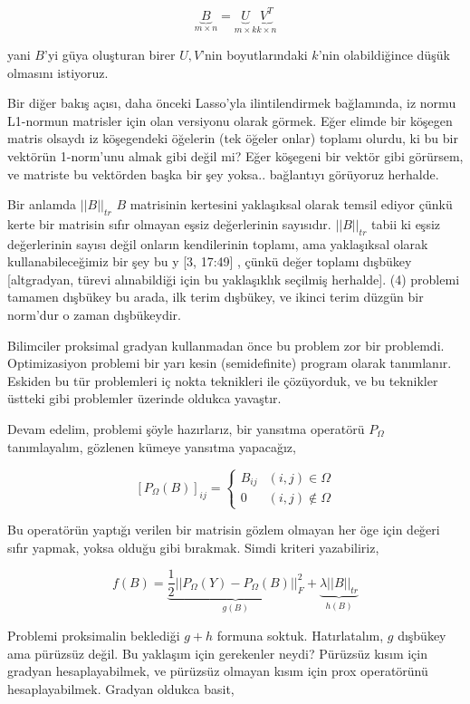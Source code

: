 \documentclass[12pt,fleqn]{article}\usepackage{../../common}
\begin{document}
$$
\underbrace{B}_{m \times n} = 
\underbrace{U}_{m \times k}
\underbrace{V^T}_{k \times n}
$$

yani $B$'yi güya oluşturan birer $U,V$'nin boyutlarındaki $k$'nin
olabildiğince düşük olmasını istiyoruz. 

Bir diğer bakış açısı, daha önceki Lasso'yla ilintilendirmek bağlamında, iz
normu L1-normun matrisler için olan versiyonu olarak görmek. Eğer elimde
bir köşegen matris olsaydı iz köşegendeki öğelerin (tek öğeler onlar)
toplamı olurdu, ki bu bir vektörün 1-norm'unu almak gibi değil mi? Eğer
köşegeni bir vektör gibi görürsem, ve matriste bu vektörden başka bir şey
yoksa.. bağlantıyı görüyoruz herhalde. 

Bir anlamda $||B||_{tr}$ $B$ matrisinin kertesini yaklaşıksal olarak temsil
ediyor çünkü kerte bir matrisin sıfır olmayan eşsiz değerlerinin
sayısıdır. $||B||_{tr}$ tabii ki eşsiz değerlerinin sayısı değil onların
kendilerinin toplamı, ama yaklaşıksal olarak kullanabileceğimiz bir şey bu
y [3, 17:49] , çünkü değer toplamı dışbükey [altgradyan, türevi
alınabildiği için bu yaklaşıklık seçilmiş herhalde].  (4) problemi tamamen
dışbükey bu arada, ilk terim dışbükey, ve ikinci terim düzgün bir norm'dur
o zaman dışbükeydir.

Bilimciler proksimal gradyan kullanmadan önce bu problem zor bir
problemdi. Optimizasiyon problemi bir yarı kesin (semidefinite) program
olarak tanımlanır. Eskiden bu tür problemleri iç nokta teknikleri ile
çözüyorduk, ve bu teknikler üstteki gibi problemler üzerinde oldukca
yavaştır. 

Devam edelim, problemi şöyle hazırlarız, bir yansıtma operatörü $P_\Omega$
tanımlayalım, gözlenen kümeye yansıtma yapacağız, 

$$
[P_\Omega (B) ]_{ij} = 
\left\{ \begin{array}{ll}
B_{ij} & (i,j) \in \Omega \\
0 & (i,j) \notin \Omega 
\end{array} \right.
$$

Bu operatörün yaptığı verilen bir matrisin gözlem olmayan her öge için
değeri sıfır yapmak, yoksa olduğu gibi bırakmak. Simdi kriteri yazabiliriz, 

$$
f(B) = 
\underbrace{\frac{1}{2} || P_\Omega (Y) - P_\Omega(B) ||_F^2}_{g(B)} + 
\underbrace{\lambda ||B||_{tr}}_{h(B)}
$$

Problemi proksimalin beklediği $g + h$ formuna soktuk. Hatırlatalım, $g$
dışbükey ama pürüzsüz değil. Bu yaklaşım için gerekenler neydi? Pürüzsüz
kısım için gradyan hesaplayabilmek, ve pürüzsüz olmayan kısım için prox
operatörünü hesaplayabilmek. Gradyan oldukca basit,
\end{document}
